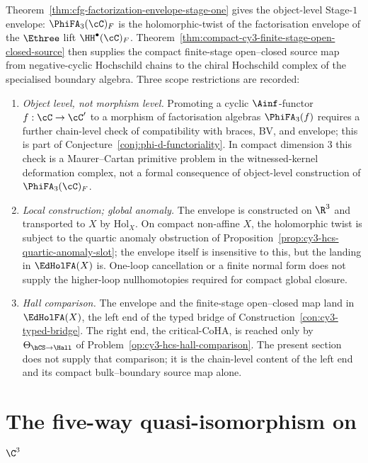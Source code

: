 \begin{remark}
\label{rem:cfg-envelope-scope}
Theorem~\ref{thm:cfg-factorization-envelope-stage-one} gives the
object-level Stage-$1$ envelope: $\PhiFA_3(\cC)_F$ is the
holomorphic-twist of the factorisation envelope of the
$\Ethree$ lift $\HH^\bullet(\cC)_F$. Theorem~\ref{thm:compact-cy3-finite-stage-open-closed-source}
then supplies the compact finite-stage open--closed source map from
negative-cyclic Hochschild chains to the chiral Hochschild complex of
the specialised boundary algebra. Three scope restrictions are recorded:
\begin{enumerate}
\item \emph{Object level, not morphism level.} Promoting a cyclic
$\Ainf$-functor $f:\cC\to\cC'$ to a morphism of factorisation algebras
$\PhiFA_3(f)$ requires a further chain-level check of compatibility
with braces, BV, and envelope; this is part of
Conjecture~\ref{conj:phi-d-functoriality}. In compact dimension $3$
this check is a Maurer--Cartan primitive problem in the witnessed-kernel
deformation complex, not a formal consequence of object-level
construction of $\PhiFA_3(\cC)_F$.
\item \emph{Local construction; global anomaly.} The envelope is
constructed on $\R^3$ and transported to $X$ by $\mathrm{Hol}_X$. On
compact non-affine $X$, the holomorphic twist is subject to the
quartic anomaly obstruction of
Proposition~\ref{prop:cy3-hcs-quartic-anomaly-slot}; the envelope
itself is insensitive to this, but the landing in $\EdHolFA(X)$ is.
One-loop cancellation or a finite normal form does not supply the
higher-loop nullhomotopies required for compact global closure.
\item \emph{Hall comparison.} The envelope and the finite-stage
open--closed map land in
$\EdHolFA(X)$, the left end of the typed bridge of
Construction~\ref{con:cy3-typed-bridge}. The right end, the
critical-CoHA, is reached only by $\Theta_{\hCS\to\Hall}$ of
Problem~\ref{op:cy3-hcs-hall-comparison}. The present section does not
supply that comparison; it is the chain-level content of the left
end and its compact bulk--boundary source map alone.
\end{enumerate}
\end{remark}

\section{The five-way quasi-isomorphism on \texorpdfstring{$\C^3$}{C3}}
\label{sec:cy3-chain-level-bridge-five-way-c3}

